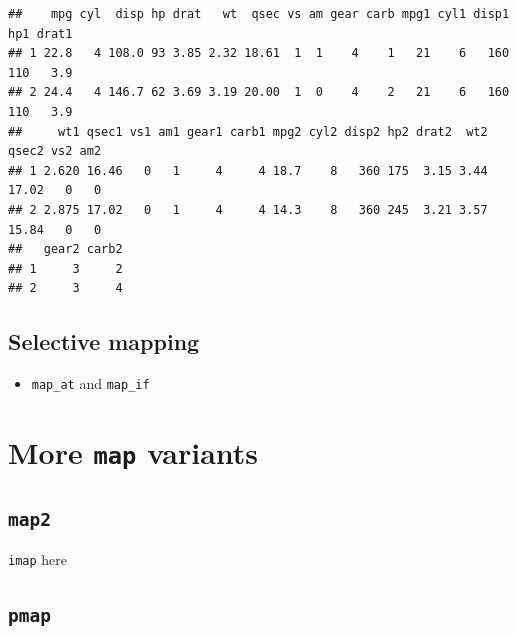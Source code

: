 \documentclass[]{book}
\newenvironment{Shaded}{}{}
\newcommand{\DataTypeTok}[1]{\textcolor[rgb]{0.56,0.13,0.00}{#1}}
\newcommand{\DecValTok}[1]{\textcolor[rgb]{0.25,0.63,0.44}{#1}}
\newcommand{\KeywordTok}[1]{\textcolor[rgb]{0.00,0.44,0.13}{\textbf{#1}}}
\newcommand{\NormalTok}[1]{#1}
\newcommand{\OperatorTok}[1]{\textcolor[rgb]{0.40,0.40,0.40}{#1}}
\newcommand{\StringTok}[1]{\textcolor[rgb]{0.25,0.44,0.63}{#1}}
\providecommand{\tightlist}{%
  \setlength{\itemsep}{0pt}\setlength{\parskip}{0pt}}
\begin{document}
\begin{Shaded}
\end{Shaded}

\begin{verbatim}
##    mpg cyl  disp hp drat   wt  qsec vs am gear carb mpg1 cyl1 disp1 hp1 drat1
## 1 22.8   4 108.0 93 3.85 2.32 18.61  1  1    4    1   21    6   160 110   3.9
## 2 24.4   4 146.7 62 3.69 3.19 20.00  1  0    4    2   21    6   160 110   3.9
##     wt1 qsec1 vs1 am1 gear1 carb1 mpg2 cyl2 disp2 hp2 drat2  wt2 qsec2 vs2 am2
## 1 2.620 16.46   0   1     4     4 18.7    8   360 175  3.15 3.44 17.02   0   0
## 2 2.875 17.02   0   1     4     4 14.3    8   360 245  3.21 3.57 15.84   0   0
##   gear2 carb2
## 1     3     2
## 2     3     4
\end{verbatim}

\hypertarget{selective-mapping}{%
\subsection{Selective mapping}\label{selective-mapping}}

\begin{itemize}
\tightlist
\item
  \texttt{map\_at} and \texttt{map\_if}
\end{itemize}

\hypertarget{more-map-variants}{%
\section{\texorpdfstring{More \texttt{map} variants}{More map variants}}\label{more-map-variants}}

\hypertarget{map2}{%
\subsection{\texorpdfstring{\texttt{map2}}{map2}}\label{map2}}

\texttt{imap} here

\hypertarget{pmap}{%
\subsection{\texorpdfstring{\texttt{pmap}}{pmap}}\label{pmap}}
\end{document}
